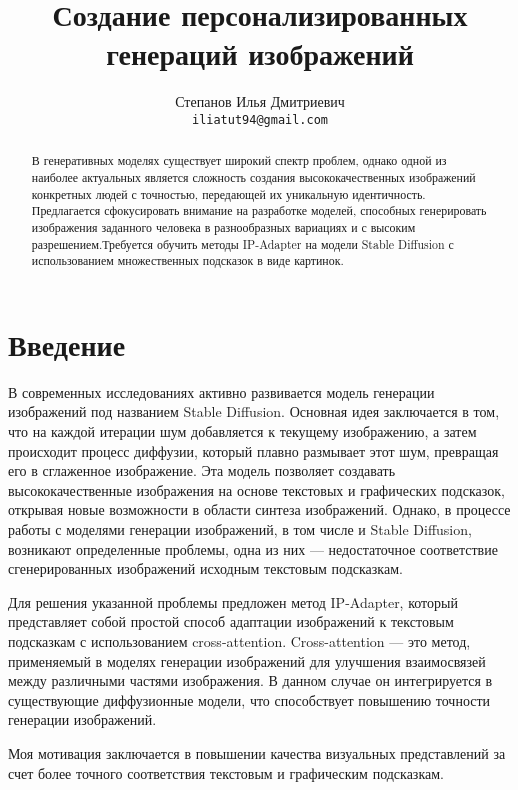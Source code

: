\documentclass{article}
\title{Создание персонализированных генераций изображений}
\author{Степанов Илья Дмитриевич \\
	\texttt{iliatut94@gmail.com} \\
}
\date{}
\begin{document}
\maketitle

\begin{abstract}
        В генеративных моделях существует широкий спектр проблем, однако одной из наиболее актуальных является сложность создания высококачественных изображений конкретных людей с точностью, передающей их уникальную идентичность. Предлагается сфокусировать внимание на разработке моделей, способных генерировать изображения заданного человека в разнообразных вариациях и с высоким разрешением.Требуется обучить методы IP-Adapter на модели Stable Diffusion с использованием множественных подсказок в виде картинок.
\end{abstract}



\section{Введение}

В современных исследованиях активно развивается модель генерации изображений под названием Stable Diffusion.
Основная идея заключается в том, что на каждой итерации шум добавляется к текущему изображению, а затем происходит процесс диффузии, который плавно размывает этот шум, превращая его в сглаженное изображение.
Эта модель позволяет создавать высококачественные изображения на основе текстовых и графических подсказок, открывая новые возможности в области синтеза изображений. Однако, в процессе работы с моделями генерации изображений, в том числе и Stable Diffusion, возникают определенные проблемы, одна из них --- недостаточное соответствие сгенерированных изображений исходным текстовым подсказкам.

Для решения указанной проблемы предложен метод IP-Adapter, который представляет собой простой способ адаптации изображений к текстовым подсказкам с использованием cross-attention. Cross-attention --- это метод, применяемый в моделях генерации изображений для улучшения взаимосвязей между различными частями изображения. В данном случае он интегрируется в существующие диффузионные модели, что способствует повышению точности генерации изображений.

Моя мотивация заключается в повышении качества визуальных представлений за счет более точного соответствия текстовым и графическим подсказкам.
\end{document}
